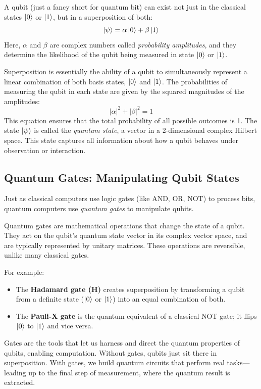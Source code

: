 \documentclass{article}
\begin{document}
\begin{definitionbox}[title=Qubit]
    A qubit (just a fancy short for quantum bit) can exist not just in the classical states $\ket{0}$ or $\ket{1}$, but in a superposition of both:
    \[
        \ket{\psi} = \alpha \ket{0} + \beta \ket{1}
    \]
    Here, $\alpha$ and $\beta$ are complex numbers called \emph{probability amplitudes}, and they determine the likelihood of the qubit being measured in state $\ket{0}$ or $\ket{1}$.
\end{definitionbox}

Superposition is essentially the ability of a qubit to simultaneously represent a linear combination of both basis states, $\ket{0}$ and $\ket{1}$. The probabilities of measuring the qubit in each state are given by the squared magnitudes of the amplitudes:
\[
    |\alpha|^2 + |\beta|^2 = 1
\]
This equation ensures that the total probability of all possible outcomes is 1. The state $\ket{\psi}$ is called the \emph{quantum state}, a vector in a 2-dimensional complex Hilbert space. This state captures all information about how a qubit behaves under observation or interaction.

\subsection{Quantum Gates: Manipulating Qubit States}
Just as classical computers use logic gates (like AND, OR, NOT) to process bits, quantum computers use \emph{quantum gates} to manipulate qubits.

Quantum gates are mathematical operations that change the state of a qubit. They act on the qubit's quantum state vector in its complex vector space, and are typically represented by unitary matrices. These operations are reversible, unlike many classical gates.

For example:
\begin{itemize}
    \item The \textbf{Hadamard gate (H)} creates superposition by transforming a qubit from a definite state ($\ket{0}$ or $\ket{1}$) into an equal combination of both.
    \item The \textbf{Pauli-X gate} is the quantum equivalent of a classical NOT gate; it flips $\ket{0}$ to $\ket{1}$ and vice versa.
\end{itemize}

Gates are the tools that let us harness and direct the quantum properties of qubits, enabling computation. Without gates, qubits just sit there in superposition. With gates, we build quantum circuits that perform real tasks—leading up to the final step of measurement, where the quantum result is extracted.
\end{document}
